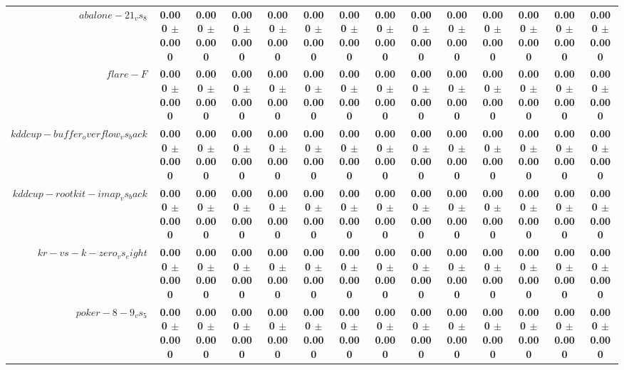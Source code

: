 \begin{table}[!ht]
{\begin{tabular}{r c c c c c c c c c c c c c}
$abalone-21_vs_8$ & \textbf{0.000 $\pm$ 0.000} & \textbf{0.000 $\pm$ 0.000} & \textbf{0.000 $\pm$ 0.000} & \textbf{0.000 $\pm$ 0.000} & \textbf{0.000 $\pm$ 0.000} & \textbf{0.000 $\pm$ 0.000} & \textbf{0.000 $\pm$ 0.000} & \textbf{0.000 $\pm$ 0.000} & \textbf{0.000 $\pm$ 0.000} & \textbf{0.000 $\pm$ 0.000} & \textbf{0.000 $\pm$ 0.000} & \textbf{0.000 $\pm$ 0.000} & \textbf{0.000 $\pm$ 0.000} \\
$flare-F$ & \textbf{0.000 $\pm$ 0.000} & \textbf{0.000 $\pm$ 0.000} & \textbf{0.000 $\pm$ 0.000} & \textbf{0.000 $\pm$ 0.000} & \textbf{0.000 $\pm$ 0.000} & \textbf{0.000 $\pm$ 0.000} & \textbf{0.000 $\pm$ 0.000} & \textbf{0.000 $\pm$ 0.000} & \textbf{0.000 $\pm$ 0.000} & \textbf{0.000 $\pm$ 0.000} & \textbf{0.000 $\pm$ 0.000} & \textbf{0.000 $\pm$ 0.000} & \textbf{0.000 $\pm$ 0.000} \\
$kddcup-buffer_overflow_vs_back$ & \textbf{0.000 $\pm$ 0.000} & \textbf{0.000 $\pm$ 0.000} & \textbf{0.000 $\pm$ 0.000} & \textbf{0.000 $\pm$ 0.000} & \textbf{0.000 $\pm$ 0.000} & \textbf{0.000 $\pm$ 0.000} & \textbf{0.000 $\pm$ 0.000} & \textbf{0.000 $\pm$ 0.000} & \textbf{0.000 $\pm$ 0.000} & \textbf{0.000 $\pm$ 0.000} & \textbf{0.000 $\pm$ 0.000} & \textbf{0.000 $\pm$ 0.000} & \textbf{0.000 $\pm$ 0.000} \\
$kddcup-rootkit-imap_vs_back$ & \textbf{0.000 $\pm$ 0.000} & \textbf{0.000 $\pm$ 0.000} & \textbf{0.000 $\pm$ 0.000} & \textbf{0.000 $\pm$ 0.000} & \textbf{0.000 $\pm$ 0.000} & \textbf{0.000 $\pm$ 0.000} & \textbf{0.000 $\pm$ 0.000} & \textbf{0.000 $\pm$ 0.000} & \textbf{0.000 $\pm$ 0.000} & \textbf{0.000 $\pm$ 0.000} & \textbf{0.000 $\pm$ 0.000} & \textbf{0.000 $\pm$ 0.000} & \textbf{0.000 $\pm$ 0.000} \\
$kr-vs-k-zero_vs_eight$ & \textbf{0.000 $\pm$ 0.000} & \textbf{0.000 $\pm$ 0.000} & \textbf{0.000 $\pm$ 0.000} & \textbf{0.000 $\pm$ 0.000} & \textbf{0.000 $\pm$ 0.000} & \textbf{0.000 $\pm$ 0.000} & \textbf{0.000 $\pm$ 0.000} & \textbf{0.000 $\pm$ 0.000} & \textbf{0.000 $\pm$ 0.000} & \textbf{0.000 $\pm$ 0.000} & \textbf{0.000 $\pm$ 0.000} & \textbf{0.000 $\pm$ 0.000} & \textbf{0.000 $\pm$ 0.000} \\
$poker-8-9_vs_5$ & \textbf{0.000 $\pm$ 0.000} & \textbf{0.000 $\pm$ 0.000} & \textbf{0.000 $\pm$ 0.000} & \textbf{0.000 $\pm$ 0.000} & \textbf{0.000 $\pm$ 0.000} & \textbf{0.000 $\pm$ 0.000} & \textbf{0.000 $\pm$ 0.000} & \textbf{0.000 $\pm$ 0.000} & \textbf{0.000 $\pm$ 0.000} & \textbf{0.000 $\pm$ 0.000} & \textbf{0.000 $\pm$ 0.000} & \textbf{0.000 $\pm$ 0.000} & \textbf{0.000 $\pm$ 0.000} \\

\end{tabular}}
\end{table}
